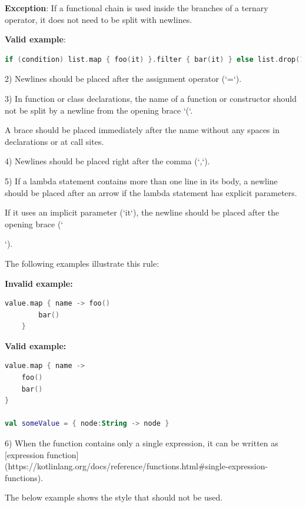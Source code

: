{\textbf{Exception}: If a functional chain is used inside the branches of a ternary operator, it does not need to be split with newlines.



\textbf{Valid example}:

\begin{lstlisting}[language=Kotlin]
if (condition) list.map { foo(it) }.filter { bar(it) } else list.drop(1)
\end{lstlisting}


2)	Newlines should be placed after the assignment operator (`=`).

3)	In function or class declarations, the name of a function or constructor should not be split by a newline from the opening brace `(`.

    A brace should be placed immediately after the name without any spaces in declarations or at call sites.

4)	Newlines should be placed right after the comma (`,`).

5)	If a lambda statement contains more than one line in its body, a newline should be placed after an arrow if the lambda statement has explicit parameters.

    If it uses an implicit parameter (`it`), the newline should be placed after the opening brace (`{`).

    The following examples illustrate this rule:





\textbf{Invalid example:}

\begin{lstlisting}[language=Kotlin]
    value.map { name -> foo()
        bar()
    }
\end{lstlisting}


\textbf{Valid example:}

\begin{lstlisting}[language=Kotlin]
value.map { name ->
    foo()
    bar()
}

val someValue = { node:String -> node }
\end{lstlisting}


6) When the function contains only a single expression, it can be written as [expression function](https://kotlinlang.org/docs/reference/functions.html\#single-expression-functions).

   The below example shows the style that should not be used.



}}
